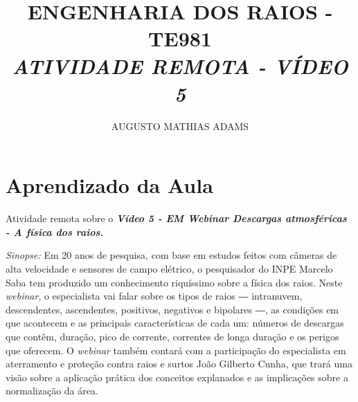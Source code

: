 \documentclass[a4paper, 12pt, onecolumn,singlespacing]{article}
\title{\normalsize{ENGENHARIA DOS RAIOS - TE981}\\ \huge{\textbf\textit{{ATIVIDADE REMOTA - VÍDEO 5}}\\}}
\author{\small{AUGUSTO MATHIAS ADAMS}}
\begin{document}
	
	\maketitle

	\section{Aprendizado da Aula}
	
	Atividade remota sobre o \textbf{\textit{Vídeo 5 - EM Webinar Descargas atmosféricas - A física dos raios.}}
	
	\textit{Sinopse: } Em 20 anos de pesquisa, com base em estudos feitos com câmeras de alta velocidade e sensores de campo elétrico, o pesquisador do INPE Marcelo Saba tem produzido um conhecimento riquíssimo sobre a física dos raios. Neste \textit{webinar}, o especialista vai falar sobre os tipos de raios ― intranuvem, descendentes, ascendentes, positivos, negativos e bipolares ―, as condições em que acontecem e as principais características de cada um: números de descargas que contêm, duração, pico de corrente, correntes de longa duração e os perigos que oferecem. O \textit{webinar} também contará com a participação do especialista em aterramento e proteção contra raios e surtos João Gilberto Cunha, que trará uma visão sobre a aplicação prática dos conceitos explanados e as implicações sobre a normalização da área.
	
\end{document}

